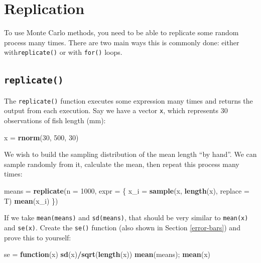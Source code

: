 \documentclass[]{book}
\newenvironment{Shaded}{\begin{snugshade}}{\end{snugshade}}
\newcommand{\KeywordTok}[1]{\textcolor[rgb]{0.13,0.29,0.53}{\textbf{#1}}}
\newcommand{\DataTypeTok}[1]{\textcolor[rgb]{0.13,0.29,0.53}{#1}}
\newcommand{\DecValTok}[1]{\textcolor[rgb]{0.00,0.00,0.81}{#1}}
\newcommand{\StringTok}[1]{\textcolor[rgb]{0.31,0.60,0.02}{#1}}
\newcommand{\ControlFlowTok}[1]{\textcolor[rgb]{0.13,0.29,0.53}{\textbf{#1}}}
\newcommand{\OperatorTok}[1]{\textcolor[rgb]{0.81,0.36,0.00}{\textbf{#1}}}
\newcommand{\NormalTok}[1]{#1}
\theoremstyle{definition}
\theoremstyle{definition}
\theoremstyle{definition}
\theoremstyle{remark}
\begin{document}
\section{Replication}\label{replication}

To use Monte Carlo methods, you need to be able to replicate some random
process many times. There are two main ways this is commonly done:
either with\texttt{replicate()} or with \texttt{for()} loops.

\subsection{\texorpdfstring{\texttt{replicate()}}{replicate()}}\label{replicate}

The \texttt{replicate()} function executes some expression many times
and returns the output from each execution. Say we have a vector
\texttt{x}, which represents 30 observations of fish length (mm):

\begin{Shaded}
\begin{Highlighting}[]
\NormalTok{x =}\StringTok{ }\KeywordTok{rnorm}\NormalTok{(}\DecValTok{30}\NormalTok{, }\DecValTok{500}\NormalTok{, }\DecValTok{30}\NormalTok{)}
\end{Highlighting}
\end{Shaded}

We wish to build the sampling distribution of the mean length ``by
hand''. We can sample randomly from it, calculate the mean, then repeat
this process many times:

\begin{Shaded}
\begin{Highlighting}[]
\NormalTok{means =}\StringTok{ }\KeywordTok{replicate}\NormalTok{(}\DataTypeTok{n =} \DecValTok{1000}\NormalTok{, }\DataTypeTok{expr =}\NormalTok{ \{}
\NormalTok{  x_i =}\StringTok{ }\KeywordTok{sample}\NormalTok{(x, }\KeywordTok{length}\NormalTok{(x), }\DataTypeTok{replace =}\NormalTok{ T)}
  \KeywordTok{mean}\NormalTok{(x_i)}
\NormalTok{\})}
\end{Highlighting}
\end{Shaded}

If we take \texttt{mean(means)} and \texttt{sd(means)}, that should be
very similar to \texttt{mean(x)} and \texttt{se(x)}. Create the
\texttt{se()} function (also shown in Section \ref{error-bars}) and
prove this to yourself:

\begin{Shaded}
\begin{Highlighting}[]
\NormalTok{se =}\StringTok{ }\ControlFlowTok{function}\NormalTok{(x) }\KeywordTok{sd}\NormalTok{(x)}\OperatorTok{/}\KeywordTok{sqrt}\NormalTok{(}\KeywordTok{length}\NormalTok{(x))}
\KeywordTok{mean}\NormalTok{(means); }\KeywordTok{mean}\NormalTok{(x)}
\end{Highlighting}
\end{Shaded}
\end{document}
